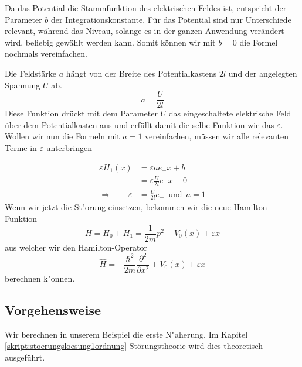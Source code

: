 \begin{refsection}
Da das Potential die Stammfunktion des elektrischen Feldes ist, entspricht der Parameter $b$ der Integrationskonstante.
F\"ur das Potential sind nur Unterschiede relevant, w\"ahrend das Niveau, solange es in der ganzen Anwendung ver\"andert wird,
beliebig gew\"ahlt werden kann. Somit k\"onnen wir mit $b=0$ die Formel nochmals vereinfachen.

Die Feldst\"arke $a$ h\"angt von der Breite des Potentialkastens $2 l$ und der angelegten Spannung $U$ ab.
\[
  a = \frac{ U }{2 l}
\]
Diese Funktion dr\"uckt mit dem Parameter $U$ das eingeschaltete elektrische Feld \"uber dem Potentialkasten aus
und erf\"ullt damit die selbe Funktion wie das $\varepsilon$.
Wollen wir nun die Formeln mit $a=1$ vereinfachen, m\"ussen wir alle relevanten Terme  in $\varepsilon$ unterbringen

\begin{equation}
\begin{aligned}
  \varepsilon H_1(x) &= \varepsilon a e_{-} x +b  \\
                     &= \varepsilon \frac{ U }{2 l} e_{-} x + 0  \\ 
  \Longrightarrow \qquad \varepsilon &= \frac{ U }{2 l} e_{-} \, \text{ und } \, a = 1
\end{aligned}
\end{equation}
Wenn wir jetzt die St"orung einsetzen, bekommen wir die neue Hamilton-Funktion
\[
  H = H_0 + H_1 
    = \frac1{2m}p^2+V_0(x) + \varepsilon x
\]
aus welcher wir den Hamilton-Operator
\[
  \hat{H} = -\frac{\hbar^2}{2m} \frac{\partial^2}{\partial x^2} + V_0(x) + \varepsilon x
\]
berechnen k"onnen.

\subsection{Vorgehensweise}
Wir berechnen in unserem Beispiel die erste N"aherung.
Im Kapitel \ref{skript:stoerungsloesung1ordnung} St\"orungstheorie wird dies 
theoretisch ausgef\"uhrt.


\end{refsection}
